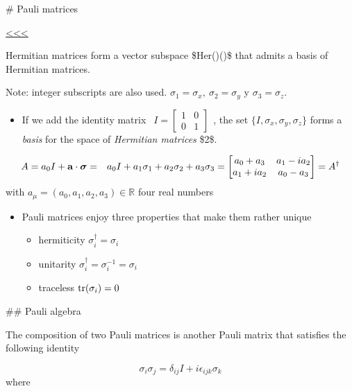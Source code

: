 \documentclass[11pt]{article}
\providecommand{\tightlist}{%
      \setlength{\itemsep}{0pt}\setlength{\parskip}{0pt}}
\begin{document}
    \# Pauli matrices

\hyperref[top]{<<<}

    Hermitian matrices form a vector subspace
\$\hbox{Her}(\Hil)\subset \Lin(\Hil)\$ that admits a basis of Hermitian
matrices.

    

    Note: integer subscripts are also used. \(\sigma_1=\sigma_x, ~
\sigma_2=\sigma_y\) y \(\sigma_3=\sigma_z\).

    \begin{itemize}
\tightlist
\item
  If we add the identity matrix
  \(~~I = \begin{bmatrix} 1 & 0 \\ 0 & 1 \end{bmatrix}~~\), the set
  \(\{I,\sigma_x,\sigma_y,\sigma_z \}\) forms a \emph{basis} for the
  space of \emph{Hermitian matrices} \$2\$.
\end{itemize}

\begin{eqnarray}
A = a_0 I + {\bf a} \cdot \boldsymbol{\sigma}  &=&   a_0 I + a_1 \sigma_1 + a_2 \sigma_2 + a_3 \sigma_3  = 
\begin{bmatrix}
a_0 + a_3 & a_1 - i a_2 \\ a_1 + i a_2 & a_0 - a_3
\end{bmatrix} = A^\dagger
\end{eqnarray} with \(a_\mu = (a_0, a_1, a_2, a_3) \in {\mathbb R}\)
four real numbers

    \begin{itemize}
\item
  Pauli matrices enjoy three properties that make them rather unique

  \begin{itemize}
  \item
    hermiticity \(\sigma_i^\dagger = \sigma_i\)
  \item
    unitarity \(\sigma_i^\dagger = \sigma_i^{-1} = \sigma_i\)
  \item
    traceless \({\rm tr}(\sigma_i) = 0\)
  \end{itemize}
\end{itemize}

    \#\# Pauli algebra

The composition of two Pauli matrices is another Pauli matrix that
satisfies the following identity

\[
\sigma_i \sigma_j = \delta_{ij}I + i\epsilon_{ijk}  \sigma_k
\] where
\end{document}
